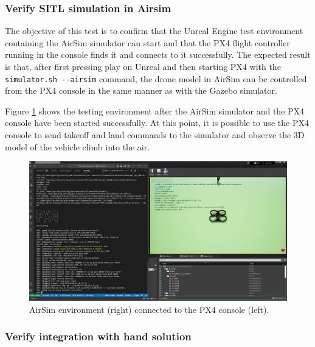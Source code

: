 \subsubsection{Verify SITL simulation in Airsim}

The objective of this test is to confirm that the Unreal Engine test environment containing the AirSim simulator can start and that the PX4 flight controller running in the console finds it and connects to it successfully. The expected result is that, after first pressing play on Unreal and then starting PX4 with the \texttt{simulator.sh -{}-airsim} command, the drone model in AirSim can be controlled from the PX4 console in the same manner as with the Gazebo simulator.

Figure \ref{fig:airsim-sitl} shows the testing environment after the AirSim simulator and the PX4 console have been started successfully.
At this point, it is possible to use the PX4 console to send takeoff and land commands to the simulator and observe the 3D model of the vehicle climb into the air.

\begin{figure}[H]
  \centering
  \includegraphics[width=\textwidth, keepaspectratio]{img/airsim-sitl.png}
  \caption{AirSim environment (right) connected to the PX4 console (left).}
  \label{fig:airsim-sitl}
\end{figure}


\subsubsection{Verify integration with hand solution}

